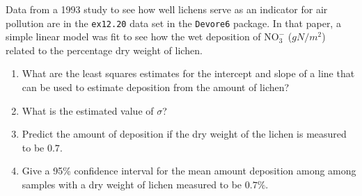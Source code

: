 \documentclass[twoside]{book}
\newcommand{\Rindex}[1]{\index{\texttt{#1}}}
\newcommand{\dataframe}[1]{{\color{blue!80!black}\texttt{#1}}\Rindex{#1}}
\newcommand{\pkg}[1]{{\color{red!80!black}\texttt{#1}}\Rindex{#1}}
\begin{document}
\begin{problem}
Data from a 1993 study to see how well lichens serve as an indicator for air pollution
are in the \dataframe{ex12.20} data set in the \pkg{Devore6} package.  In that paper,
a simple linear model was fit to see how the wet deposition of $\mathrm{NO}_{3}^{-}$
($g N/m^2$) related to the percentage dry weight of lichen.
\begin{enumerate}
	\item What are the least squares estimates for the intercept and slope of a line
		that can be used to estimate deposition
		from the amount of lichen?
	\item
		What is the estimated value of $\sigma$?
	\item
		Predict the amount of deposition if the dry weight of the 
		lichen is measured to be $0.7$.
	\item
		Give a 95\% confidence interval for the mean amount deposition among
		among samples with a dry weight of lichen measured to be $0.7\%$.
\end{enumerate}
\end{problem}
\end{document}
